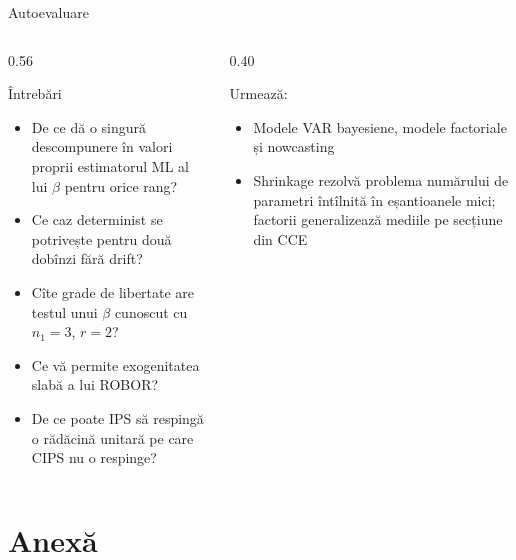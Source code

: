 \begin{frame}{Autoevaluare}
\itemsize{\small}
\begin{columns}[T]
\begin{column}{0.56\textwidth}
\begin{block}{Întrebări}
\begin{itemize}
    \item De ce dă o singură descompunere în valori proprii estimatorul ML al lui $\beta$ pentru orice rang?
    \item Ce caz determinist se potrivește pentru două dobînzi fără drift?
    \item Cîte grade de libertate are testul unui $\beta$ cunoscut cu $n_1 = 3$, $r = 2$?
    \item Ce vă permite exogenitatea slabă a lui ROBOR?
    \item De ce poate IPS să respingă o rădăcină unitară pe care CIPS nu o respinge?
\end{itemize}
\end{block}
\end{column}
\begin{column}{0.40\textwidth}
\begin{block}{Urmează: }
\begin{itemize}
    \item Modele VAR bayesiene, modele factoriale și nowcasting
    \item Shrinkage rezolvă problema numărului de parametri întîlnită în eșantioanele mici; factorii generalizează mediile pe secțiune din CCE
\end{itemize}
\end{block}
\end{column}
\end{columns}
\end{frame}


\section{Anexă}

